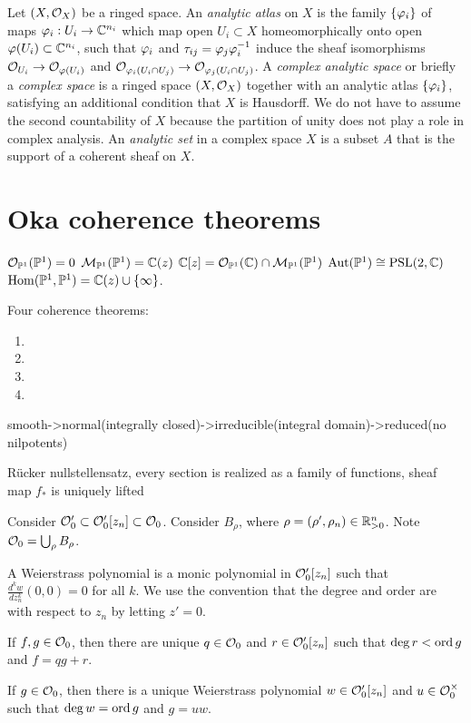 \documentclass{../../large}
\begin{document}
\begin{prb}
Let $(X,\mathcal{O}_X)$ be a ringed space.
An \emph{analytic atlas} on $X$ is the family $\{\varphi_i\}$ of maps $\varphi_i:U_i\to\mathbb{C}^{n_i}$ which map open $U_i\subset X$ homeomorphically onto open $\varphi(U_i)\subset\mathbb{C}^{n_i}$, such that $\varphi_i$ and $\tau_{ij}=\varphi_j\varphi_i^{-1}$ induce the sheaf isomorphisms $\mathcal{O}_{U_i}\to\mathcal{O}_{\varphi(U_i)}$ and $\mathcal{O}_{\varphi_i(U_i\cap U_j)}\to\mathcal{O}_{\varphi_j(U_i\cap U_j)}$.
A \emph{complex analytic space} or briefly a \emph{complex space} is a ringed space $(X,\mathcal{O}_X)$ together with an analytic atlas $\{\varphi_i\}$, satisfying an additional condition that $X$ is Hausdorff.
We do not have to assume the second countability of $X$ because the partition of unity does not play a role in complex analysis.
An \emph{analytic set} in a complex space $X$ is a subset $A$ that is the support of a coherent sheaf on $X$.
\end{prb}




\section{Oka coherence theorems}

$\mathcal{O}_{\mathbb{P}^1}(\mathbb{P}^1)=0$
$\mathcal{M}_{\mathbb{P}^1}(\mathbb{P}^1)=\mathbb{C}(z)$
$\mathbb{C}[z]=\mathcal{O}_{\mathbb{P}^1}(\mathbb{C})\cap\mathcal{M}_{\mathbb{P}^1}(\mathbb{P}^1)$
$\operatorname{Aut}(\mathbb{P}^1)\cong\mathrm{PSL}(2,\mathbb{C})$
$\operatorname{Hom}(\mathbb{P}^1,\mathbb{P}^1)=\mathbb{C}(z)\cup\{\infty\}$.



Four coherence theorems:
\begin{enumerate}
\item 
\item
\item
\item
\end{enumerate}

\begin{prb}
smooth->normal(integrally closed)->irreducible(integral domain)->reduced(no nilpotents)
\end{prb}

\begin{prb}
R\"ucker nullstellensatz,
every section is realized as a family of functions,
sheaf map $f_*$ is uniquely lifted
\end{prb}

\begin{prb}
Consider $\mathcal{O}'_0\subset\mathcal{O}'_0[z_n]\subset\mathcal{O}_0$.
Consider $B_\rho$, where $\rho=(\rho',\rho_n)\in\mathbb{R}_{>0}^n$.
Note $\mathcal{O}_0=\bigcup_\rho B_\rho$.

A Weierstrass polynomial is a monic polynomial in $\mathcal{O}'_0[z_n]$ such that $\frac{d^kw}{dz_n^k}(0,0)=0$ for all $k$.
We use the convention that the degree and order are with respect to $z_n$ by letting $z'=0$.
\begin{parts}
\item If $f,g\in\mathcal{O}_0$, then there are unique $q\in\mathcal{O}_0$ and $r\in\mathcal{O}'_0[z_n]$ such that $\deg r<\operatorname{ord} g$ and $f=qg+r$.
\item If $g\in\mathcal{O}_0$, then there is a unique Weierstrass polynomial $w\in\mathcal{O}'_0[z_n]$ and $u\in\mathcal{O}_0^\times$ such that $\deg w=\operatorname{ord} g$ and $g=uw$.
\end{parts}
\end{prb}
\end{document}
